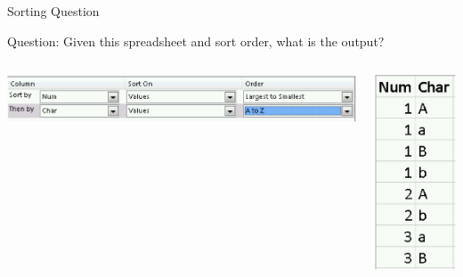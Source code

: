 \documentclass[xcolor=svgnames]{beamer}
\begin{document}
\begin{frame}{Sorting Question}
\begin{exampleblock}{Question:} Given this spreadsheet and sort order, what is the output?
\end{exampleblock}
\begin{columns}[T] %
\begin{column}{.65\textwidth}
\vspace{5em}
  \includegraphics[width=1.15\textwidth]{SortingQ2}
\end{column}%
\hfill%
\begin{column}{.33\textwidth}
  \includegraphics[height=0.7\textheight]{SortingQuestion}
  \end{column}%
\end{columns}
\end{frame}
\end{document}
